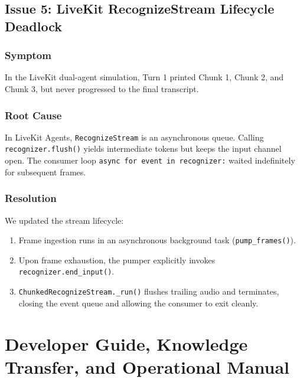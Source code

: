 \documentclass[11pt,a4paper,titlepage]{report}
\begin{document}
\section{Issue 5: LiveKit RecognizeStream Lifecycle Deadlock}
\subsection{Symptom}
In the LiveKit dual-agent simulation, Turn 1 printed Chunk 1, Chunk 2, and Chunk 3, but never progressed to the final transcript.

\subsection{Root Cause}
In LiveKit Agents, \texttt{RecognizeStream} is an asynchronous queue. Calling \texttt{recognizer.flush()} yields intermediate tokens but keeps the input channel open. The consumer loop \texttt{async for event in recognizer:} waited indefinitely for subsequent frames.

\subsection{Resolution}
We updated the stream lifecycle:
\begin{enumerate}
    \item Frame ingestion runs in an asynchronous background task (\texttt{pump\_frames()}).
    \item Upon frame exhaustion, the pumper explicitly invokes \texttt{recognizer.end\_input()}.
    \item \texttt{ChunkedRecognizeStream.\_run()} flushes trailing audio and terminates, closing the event queue and allowing the consumer to exit cleanly.
\end{enumerate}

\newpage

\chapter{Developer Guide, Knowledge Transfer, and Operational Manual}
\end{document}
